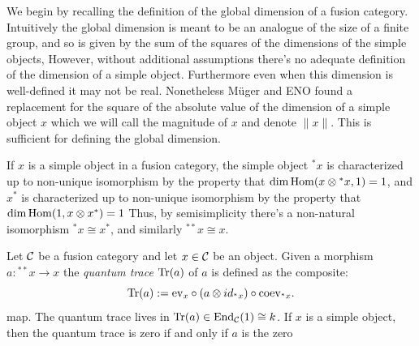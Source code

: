 \documentclass{amsart}
\begin{document}

We begin by recalling the definition of the global dimension of a fusion category.  Intuitively the global dimension is meant to be an analogue of the size of a finite group, and so is given by the sum of the squares of the dimensions of the simple objects,  However, without additional assumptions there's no adequate definition of the dimension of a simple object.  Furthermore even when this dimension is well-defined it may not be real.  Nonetheless M\"uger and ENO found a replacement for the square of the absolute value of the dimension of a simple object $x$ which we will call the magnitude of $x$ and denote $\lVert x \rVert$.  This is sufficient for defining the global dimension.

If $x$ is a simple object in a fusion category, the simple object ${}^*x$ is characterized up to non-unique isomorphism by the property that $\dim \operatorname{Hom}(x \otimes {}^*x, 1) = 1$, and $x^*$ is characterized up to non-unique isomorphism by the property that $\dim \operatorname{Hom}(1, x \otimes x^*) = 1$  Thus, by semisimplicity there's a non-natural isomorphism ${}^*x \cong x^*$, and similarly ${}^{**}x \cong x$.  

\begin{definition}
Let $\mathcal C$ be a fusion category and let $x \in \mathcal C$ be an object. Given a morphism $a: {}^{**}x \to x$ the {\em quantum trace} $\mathrm{Tr}(a)$ of $a$ is defined as the composite: %
\begin{equation*}
	\mathrm{Tr}(a) := \mathrm{ev}_x \circ (a \otimes id_{{}^*x}) \circ \mathrm{coev}_{{}^*x}.
\end{equation*}
map.  The quantum trace lives in $\mathrm{Tr}(a) \in \operatorname{End}_\mathcal C(1) \cong k$. If $x$ is a simple object, then the quantum trace is zero if and only if $a$ is the zero 
\end{definition}
\end{document}

